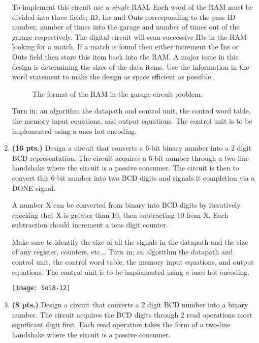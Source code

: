 \begin{enumerate}
        To implement this circuit use a \textit{ single} RAM.  Each word of the
        RAM must be divided into three fields; ID, Ins and Outs corresponding to
        the pass ID number, number of times into the garage and number of times
        out of the garage respectively.   The digital circuit will scan successive
        IDs in the RAM looking for a match.  If a match
        is found then either increment the Ins or Outs field then store this
        item back into the RAM.  A major issue in this design is determining
        the sizes of the data items.  Use the information in the word statement
        to make the design as space efficient as possible.
        \begin{figure}[ht]
            \caption{The format of the RAM in the garage circuit problem.}
            \label{fig:GarRAM}
        \end{figure}
        Turn in; an algorithm the datapath and control unit, the control word
        table, the memory input equations, and output equations.
        The control unit is to be implemented using a ones hot encoding.

    \item \textbf{ (16 pts.)} Design a circuit that converts a 6-bit binary number into a 2
        digit BCD representation.  The circuit acquires a 6-bit number through
        a two-line handshake where the circuit is a passive consumer.  The
        circuit is then to convert this 6-bit number into two BCD digits and
        signals it completion via a DONE signal.

        A number X can be converted from binary into BCD digits by iteratively
        checking that X is greater than 10, then subtracting 10 from X.  Each
        subtraction should increment a tens digit counter.

        Make sure to identify the size of all the signals in the datapath
        and the size of any register, counters, etc...
        Turn in; an algorithm the datapath and control unit, the control word
        table, the memory input equations, and output equations.
        The control unit is to be implemented using a ones hot encoding.
        \begin{onlysolution}\par
            \texttt{[image: Sol8-12]}
        \end{onlysolution}
    \item \textbf{ (8 pts.)}
        Design a circuit that converts a 2 digit BCD number into a
        binary number.  The circuit acquires the BCD digits through 2 read
        operations most significant digit first.  Each read operation takes
        the form of a two-line handshake where the circuit is a passive
        consumer.


\end{enumerate}
